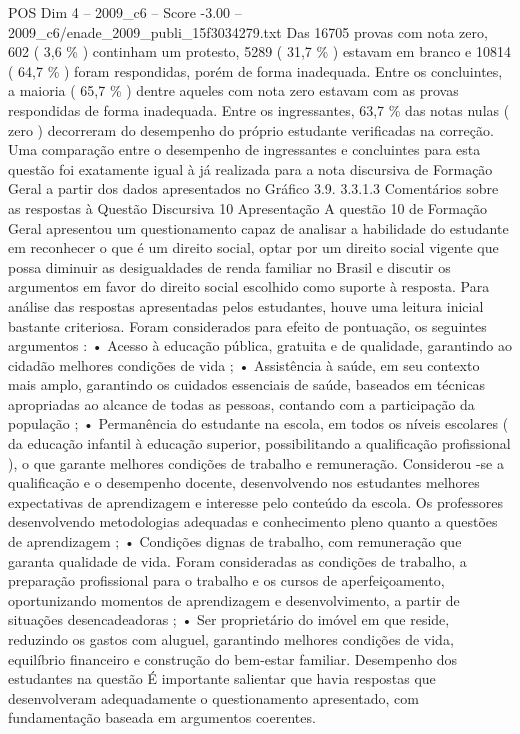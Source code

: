 \begin{textsample}{POS Dim 4 – 2009\_c6 – Score -3.00 – 2009\_c6/enade\_2009\_publi\_15f3034279.txt}
Das 16705 provas com nota zero, 602 ( 3,6 \% ) continham um protesto, 5289 ( 31,7 \% ) estavam em branco e 10814 ( 64,7 \% ) foram respondidas, porém de forma inadequada.
Entre os concluintes, a maioria ( 65,7 \% ) dentre aqueles com nota zero estavam com as provas respondidas de forma inadequada.
Entre os ingressantes, 63,7 \% das notas nulas ( zero ) decorreram do desempenho do próprio estudante verificadas na correção.
Uma comparação entre o desempenho de ingressantes e concluintes para esta questão foi exatamente igual à já realizada para a nota discursiva de Formação Geral a partir dos dados apresentados no Gráfico 3.9. 3.3.1.3 Comentários sobre as respostas à Questão Discursiva 10 Apresentação A questão 10 de Formação Geral apresentou um questionamento capaz de analisar a habilidade do estudante em reconhecer o que é um direito social, optar por um direito social vigente que possa diminuir as desigualdades de renda familiar no Brasil e discutir os argumentos em favor do direito social escolhido como suporte à resposta.
Para análise das respostas apresentadas pelos estudantes, houve uma leitura inicial bastante criteriosa.
Foram considerados para efeito de pontuação, os seguintes argumentos : • Acesso à educação pública, gratuita e de qualidade, garantindo ao cidadão melhores condições de vida ; • Assistência à saúde, em seu contexto mais amplo, garantindo os cuidados essenciais de saúde, baseados em técnicas apropriadas ao alcance de todas as pessoas, contando com a participação da população ; • Permanência do estudante na escola, em todos os níveis escolares ( da educação infantil à educação superior, possibilitando a qualificação profissional ), o que garante melhores condições de trabalho e remuneração.
Considerou -se a qualificação e o desempenho docente, desenvolvendo nos estudantes melhores expectativas de aprendizagem e interesse pelo conteúdo da escola.
Os professores desenvolvendo metodologias adequadas e conhecimento pleno quanto a questões de aprendizagem ; • Condições dignas de trabalho, com remuneração que garanta qualidade de vida.
Foram consideradas as condições de trabalho, a preparação profissional para o trabalho e os cursos de aperfeiçoamento, oportunizando momentos de aprendizagem e desenvolvimento, a partir de situações desencadeadoras ; • Ser proprietário do imóvel em que reside, reduzindo os gastos com aluguel, garantindo melhores condições de vida, equilíbrio financeiro e construção do bem-estar familiar.
Desempenho dos estudantes na questão É importante salientar que havia respostas que desenvolveram adequadamente o questionamento apresentado, com fundamentação baseada em argumentos coerentes.

\end{textsample}
